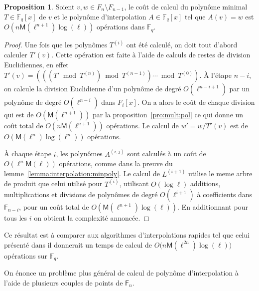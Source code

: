 \documentclass[10pt,a4paper]{book}
\theoremstyle{plain}
\theoremstyle{definition}
\theoremstyle{definition}
\theoremstyle{definition}
\newtheorem{prop}[thm]{Proposition}
\theoremstyle{definition}
\theoremstyle{remark}
\theoremstyle{remark}
\theoremstyle{definition}
\begin{document}
\begin{prop}
  Soient $v,w\in F_n\setminus F_{n-1}$, le coût de calcul du polynôme minimal
  $T\in \mathbb{F}_q[x]$ de $v$ et le polynôme d'interpolation $A\in 
  \mathbb{F}_q[x]$ tel que $A(v)=w$ est $O(n\mathsf{M}(\ell^{n+1})\log(\ell))$
  opérations dans $\mathbb{F}_q$.
\end{prop}
\begin{proof}
  Une fois que les polynômes $T^{(i)}$ ont été calculé, on doit tout d'abord 
  calculer $T'(v)$. Cette opération est faite à l'aide de calculs de restes de 
  division Euclidiennes, en effet
  $T'(v) = (((T' \bmod T^{(n)}) \bmod T^{(n-1)}) \cdots \bmod T^{(0)})$.
  \`A l'étape $n-i$, on calcule la division Euclidienne d'un polynôme de degré
   $O(\ell^{n-i+1})$ par un polynôme de degré $O(\ell^{n-i})$ dans  $F_i[x]$. 
   On a alors le coût de chaque division qui est de $O(\mathsf{M}(\ell^{n+1}))$ 
   par la proposition~\ref{pro:mult:pol} 
   ce qui donne un coût total de $O(n\mathsf{M}(\ell^{n+1}))$ opérations.
   Le calcul de $w'=w/T'(v)$ est de $O(\mathsf{M}(\ell^n)\log(\ell^n))$ opérations.

  \`A chaque étape $i$, les polynômes $A^{(i,j)}$ sont calculés à un coût de
  $O(\ell^n\mathsf{M}(\ell))$ opérations, comme dans la preuve du  
  lemme~\ref{lemma:interpolation:minpoly}.  Le calcul de $L^{(i+1)}$ utilise 
  le meme arbre de produit que celui utilisé pour $T^{(i)}$, 
  utilisant $O(\log \ell)$ additions, multiplications et divisions de polynômes
  de degré $O(\ell^{i+1})$ à coefficients dans $\mathsf{F}_{n-i}$, pour un coût
   total de $O(\mathsf{M}(\ell^{n+1})\log(\ell))$. En additionnant pour tous les
  $i$ on obtient la complexité annoncée.
\end{proof}

Ce résultat est à comparer aux algorithmes d'interpolations rapides 
 tel que  celui présenté dans \cite[Chapter~10.2]{vzGJG03} il donnerait un temps
 de calcul de  $O\bigl(n\mathsf{M}(\ell^{2n})\log(\ell)\bigr)$ opérations sur 
 $\mathbb{F}_q$. 

On énonce un problème plus général de calcul de polynôme d'interpolation 
à l'aide de plusieurs couples de points de $\mathsf{F}_n$.
\end{document}
